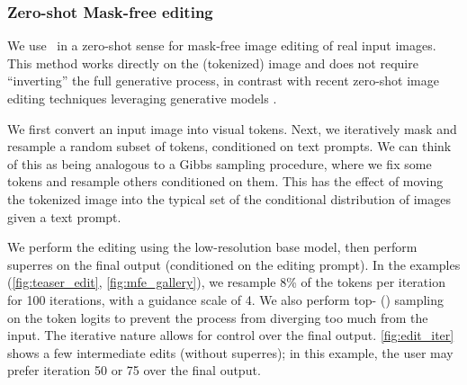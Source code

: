 \subsubsection{Zero-shot Mask-free editing}
We use \name~in a zero-shot sense for mask-free image editing of real input images. This method works directly on the (tokenized) image and does not require ``inverting'' the full generative process, in contrast with recent zero-shot image editing techniques leveraging generative models \citep{gal2022stylegan,patashnik2021styleclip,kim2022diffusionclip,nulltext2022}. 

We first convert an input image into visual tokens. Next, we iteratively mask and resample a random subset of tokens, conditioned on text prompts. We can think of this as being analogous to a Gibbs sampling procedure, where we fix some tokens and resample others conditioned on them. This has the effect of moving the tokenized image into the typical set of the conditional distribution of images given a text prompt. 

We perform the editing using the low-resolution base model, then perform superres on the final output (conditioned on the editing prompt). In the examples (\cref{fig:teaser_edit}, \cref{fig:mfe_gallery}), we resample 8\% of the tokens per iteration for 100 iterations, with a guidance scale of 4. We also perform top- () sampling on the token logits to prevent the process from diverging too much from the input. The iterative nature allows for control over the final output. \cref{fig:edit_iter} shows a few intermediate edits (without superres); in this example, the user may prefer iteration 50 or 75 over the final output.

